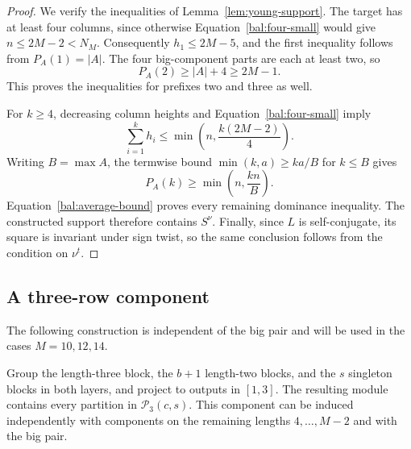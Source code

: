 \begin{proof}
We verify the inequalities of Lemma~\ref{lem:young-support}.
The target has at least four columns, since otherwise
Equation~\eqref{bal:four-small} would give
$n\le2M-2<N_M$.  Consequently $h_1\le2M-5$, and the first
inequality follows from $P_A(1)=|A|$.  The four big-component
parts are each at least two, so
\[
 P_A(2)\ge |A|+4\ge2M-1.
\]
This proves the inequalities for prefixes two and three as well.

For $k\ge4$, decreasing column heights and
Equation~\eqref{bal:four-small} imply
\[
 \sum_{i=1}^k h_i\le
       \min\left(n,\frac{k(2M-2)}4\right).
\]
Writing $B=\max A$, the termwise bound
$\min(k,a)\ge ka/B$ for $k\le B$ gives
\[
 P_A(k)\ge \min\left(n,\frac{kn}{B}\right).
\]
Equation~\eqref{bal:average-bound} proves every remaining
dominance inequality.  The constructed support therefore contains
$S^\nu$.  Finally, since $L$ is self-conjugate, its square
is invariant under sign twist, so the same conclusion follows
from the condition on $\nu^t$.
\end{proof}

\subsection{A three-row component}

The following construction is independent of the big pair and
will be used in the cases $M=10,12,14$.

\begin{proposition}
\label{prop:three-row}
Group the length-three block, the $b+1$ length-two blocks, and
the $s$ singleton blocks in both layers, and project to outputs
in $[1,3]$.  The resulting module contains every partition in
$\mathcal P_3(c,s)$.
This component can be induced independently with components on
the remaining lengths $4,\ldots,M-2$ and with the big pair.
\end{proposition}

